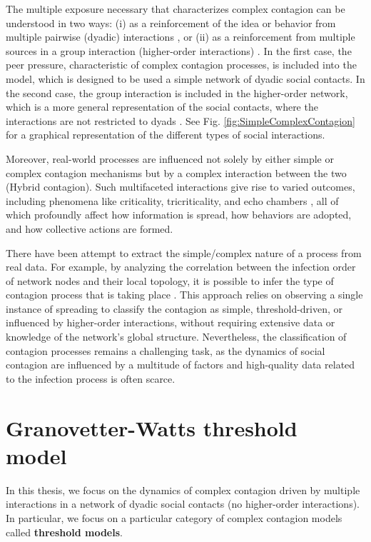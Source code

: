 The multiple exposure necessary that characterizes complex contagion can be understood in two ways: (i) as a reinforcement of the idea or behavior from multiple pairwise (dyadic) interactions \cite{centola-2007,centola-2010}, or (ii) as a reinforcement from multiple sources in a group interaction (higher-order interactions) \cite{iacopini-2019,de-arruda-2020,battiston-2021}. In the first case, the peer pressure, characteristic of complex contagion processes, is included into the model, which is designed to be used a simple network of dyadic social contacts. In the second case, the group interaction is included in the higher-order network, which is a more general representation of the social contacts, where the interactions are not restricted to dyads \cite{de-arruda-2020}. See Fig. \ref{fig:SimpleComplexContagion} for a graphical representation of the different types of social interactions.

Moreover, real-world processes are influenced not solely by either simple or complex contagion mechanisms but by a complex interaction between the two (Hybrid contagion). Such multifaceted interactions give rise to varied outcomes, including phenomena like criticality, tricriticality, and echo chambers \cite{min-2018,diaz-diaz-2022}, all of which profoundly affect how information is spread, how behaviors are adopted, and how collective actions are formed.

There have been attempt to extract the simple/complex nature of a process from real data. For example, by analyzing the correlation between the infection order of network nodes and their local topology, it is possible to infer the type of contagion process that is taking place \cite{cencetti-2023}. This approach relies on observing a single instance of spreading to classify the contagion as simple, threshold-driven, or influenced by higher-order interactions, without requiring extensive data or knowledge of the network's global structure. Nevertheless, the classification of contagion processes remains a challenging task, as the dynamics of social contagion are influenced by a multitude of factors and high-quality data related to the infection process is often scarce.

\section{\label{sec:Granovetter-Watts threshold model} Granovetter-Watts threshold model}

In this thesis, we focus on the dynamics of complex contagion driven by multiple interactions in a network of dyadic social contacts (no higher-order interactions). In particular, we focus on a particular category of complex contagion models called \textbf{threshold models}.

